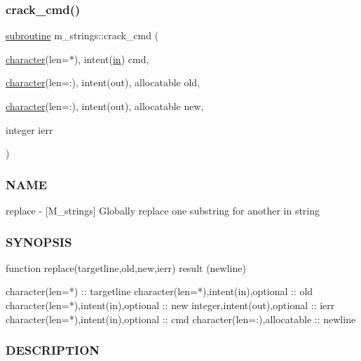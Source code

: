 \subsubsection{\texorpdfstring{crack\+\_\+cmd()}{crack\_cmd()}}
{\footnotesize\ttfamily \hyperlink{M__stopwatch_83_8txt_acfbcff50169d691ff02d4a123ed70482}{subroutine} m\+\_\+strings\+::crack\+\_\+cmd (\begin{DoxyParamCaption}\item[{\hyperlink{option__stopwatch_83_8txt_abd4b21fbbd175834027b5224bfe97e66}{character}(len=$\ast$), intent(\hyperlink{M__journal_83_8txt_afce72651d1eed785a2132bee863b2f38}{in})}]{cmd,  }\item[{\hyperlink{option__stopwatch_83_8txt_abd4b21fbbd175834027b5224bfe97e66}{character}(len=\+:), intent(out), allocatable}]{old,  }\item[{\hyperlink{option__stopwatch_83_8txt_abd4b21fbbd175834027b5224bfe97e66}{character}(len=\+:), intent(out), allocatable}]{new,  }\item[{integer}]{ierr }\end{DoxyParamCaption})\hspace{0.3cm}{\ttfamily [private]}}



\subsubsection*{N\+A\+ME}

replace -\/ \mbox{[}M\+\_\+strings\mbox{]} Globally replace one substring for another in string 

\subsubsection*{S\+Y\+N\+O\+P\+S\+IS}

\begin{DoxyVerb}function replace(targetline,old,new,ierr) result (newline)

 character(len=*)                       :: targetline
 character(len=*),intent(in),optional   :: old
 character(len=*),intent(in),optional   :: new
 integer,intent(out),optional           :: ierr
 character(len=*),intent(in),optional   :: cmd
 character(len=:),allocatable  :: newline
\end{DoxyVerb}


\subsubsection*{D\+E\+S\+C\+R\+I\+P\+T\+I\+ON}

